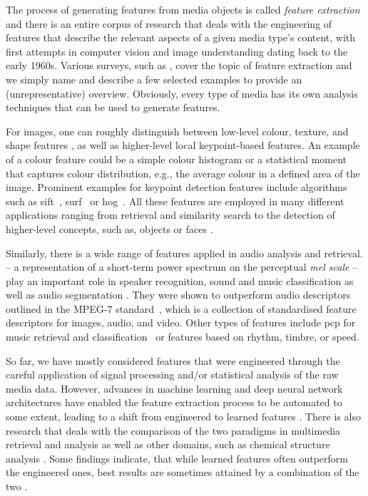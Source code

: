 The process of generating features from media objects is called \emph{feature extraction} \cite{Blanken:2007multimedia} and there is an entire corpus of research that deals with the engineering of features that describe the relevant aspects of a given media type's content, with first attempts in computer vision and image understanding dating back to the early 1960s. Various surveys, such as \cite{McKinney:2003Features,Ding:2012ASurvey,Salau:2019Feature}, cover the topic of feature extraction and we simply name and describe a few selected examples to provide an (unrepresentative) overview. Obviously, every type of media has its own analysis techniques that can be used to generate features.

For images, one can roughly distinguish between low-level colour, texture, and shape features \cite{Salau:2019Feature}, as well as higher-level local keypoint-based features. An example of a colour feature could be a simple colour histogram or a statistical moment that captures colour distribution, e.g., the average colour in a defined area of the image. Prominent examples for keypoint detection features include algorithms such as \acrfull{sift}~\cite{Lowe:1999object}, \acrfull{surf}~\cite{Bay:2006surf} or \acrfull{hog}~\cite{Dalal:2005Histograms}. All these features are employed in many different applications ranging from retrieval and similarity search to the detection of higher-level concepts, such as, objects or faces \cite{Deniz:2011Face, Farooq:2016Object}.

Similarly, there is a wide range of features applied in audio analysis and retrieval.  -- a representation of a short-term power spectrum on the perceptual \emph{mel scale} -- play an important role in speaker recognition, sound and music classification as well as audio segmentation \cite{Kim:2010Comparison}. They were shown to outperform audio descriptors outlined in the MPEG-7 standard~\cite{Quackenbush:2001Overview}, which is a collection of standardised feature descriptors for images, audio, and video. Other types of features include \acrfull{pcp} for music retrieval and classification~\cite{Lee:2006Automatic,Demirel:2019Automatic} or features based on rhythm, timbre, or speed. 

So far, we have mostly considered features that were engineered through the careful application of signal processing and/or statistical analysis of the raw media data. However, advances in machine learning and deep neural network architectures have enabled the feature extraction process to be automated to some extent, leading to a shift from  engineered to learned features \cite{Hamel:2010Learning,Gordo:2016Deep}. There is also research that deals with the comparison of the two paradigms in multimedia retrieval and analysis \cite{Budnik:2017learned} as well as other domains, such as chemical structure analysis \cite{Gallegos:2021importance}. Some findings indicate, that while learned features often outperform the engineered ones, best results are sometimes attained by a combination of the two \cite{Gallegos:2021importance}.


